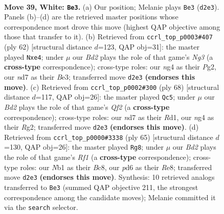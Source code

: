 \documentclass[11pt]{article}
\begin{document}
\clearpage

\begin{figure}[p]\centering
\begin{subfigure}{0.46\textwidth}\centering
\resizebox{\linewidth}{!}{%
\newchessgame
\chessboard[
  setfen={r4rk1/3n4/1q1p4/1P2bp1p/p1p3nP/P5P1/R1NBQ3/1N1R2K1 w - - 2 39},
  showmover=false,
  pgfstyle=straightmove, color=movearrow, markmove={d2-e3}
]}
\caption{}
\end{subfigure}\hfill
\begin{subfigure}{0.46\textwidth}\centering
\resizebox{\linewidth}{!}{%
\newchessgame
\chessboard[
  setfen={3rr2k/2p4p/1p2nR2/pP2P3/4b1q1/P2pB1N1/3Q2PP/4R2K w - - 5 32},
  showmover=false,
  pgfstyle=straightmove, color=movearrow, markmove={g3-e4}
]}
\caption{}
\end{subfigure}
\\[4pt]
\begin{subfigure}{0.46\textwidth}\centering
\resizebox{\linewidth}{!}{%
\newchessgame
\chessboard[
  setfen={1r1b4/1p5k/p1n1q2r/P2Np1p1/4Pp2/2B2P2/2P2QRP/3R3K w - - 8 35},
  showmover=false,
  pgfstyle=straightmove, color=movearrow, markmove={f2-c5}
]}
\caption{}
\end{subfigure}\hfill
\begin{subfigure}{0.46\textwidth}\centering
\resizebox{\linewidth}{!}{%
\newchessgame
\chessboard[
  setfen={2b1rr1k/p3n1p1/2pR1p1p/2P4q/2R4P/4PPB1/P2N1P1K/1Q6 b - - 3 33},
  showmover=false,
  pgfstyle=straightmove, color=movearrow, markmove={f8-g8}
]}
\caption{}
\end{subfigure}
\caption{\textbf{Move 39, White: \texttt{Be3}.} (a) Our position; Melanie plays \texttt{Be3} (\texttt{d2e3}). Panels (b)--(d) are the retrieved master positions whose correspondence most drove this move (highest QAP objective among those that transfer to it). (b) Retrieved from \texttt{ccrl\_top\_p0003\#407} (ply 62) [structural distance $d$=123, QAP obj=31]: the master played \texttt{Nxe4}; under $\mu$ our \emph{Bd2} plays the role of that game's \emph{Ng3} (a \textbf{cross-type} correspondence); cross-type roles: our \emph{n}g4 as their \emph{P}g2, our \emph{n}d7 as their \emph{B}e3; transferred move \texttt{d2e3} \textbf{(endorses this move)}. (c) Retrieved from \texttt{ccrl\_top\_p0002\#300} (ply 68) [structural distance $d$=117, QAP obj=26]: the master played \texttt{Qc5}; under $\mu$ our \emph{Bd2} plays the role of that game's \emph{Qf2} (a \textbf{cross-type} correspondence); cross-type roles: our \emph{n}d7 as their \emph{R}d1, our \emph{n}g4 as their \emph{R}g2; transferred move \texttt{d2e3} \textbf{(endorses this move)}. (d) Retrieved from \texttt{ccrl\_top\_p0000\#3338} (ply 65) [structural distance $d$=130, QAP obj=26]: the master played \texttt{Rg8}; under $\mu$ our \emph{Bd2} plays the role of that game's \emph{Rf1} (a \textbf{cross-type} correspondence); cross-type roles: our \emph{N}b1 as their \emph{B}c8, our \emph{p}d6 as their \emph{R}e8; transferred move \texttt{d2e3} \textbf{(endorses this move)}. Synthesis: 10 retrieved analogs transferred to \texttt{Be3} (summed QAP objective 211, the strongest correspondence among the candidate moves); Melanie committed it via the \texttt{search} selector.}
\label{fig:thought-m76}
\end{figure}
\end{document}
